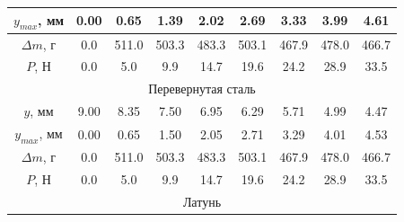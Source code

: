\documentclass[12pt]{article}
\begin{document}
\begin{enumerate}
\begin{table}
\begin{tabular}{|ccccccccc|}
            \multicolumn{1}{|c|}{$y_{max}$, мм} & \multicolumn{1}{c|}{0.00} & \multicolumn{1}{c|}{0.65}  & \multicolumn{1}{c|}{1.39}  & \multicolumn{1}{c|}{2.02}  & \multicolumn{1}{c|}{2.69}  & \multicolumn{1}{c|}{3.33}  & \multicolumn{1}{c|}{3.99}  & 4.61  \\ \hline
            \multicolumn{1}{|c|}{$\Delta m$, г} & \multicolumn{1}{c|}{0.0}  & \multicolumn{1}{c|}{511.0} & \multicolumn{1}{c|}{503.3} & \multicolumn{1}{c|}{483.3} & \multicolumn{1}{c|}{503.1} & \multicolumn{1}{c|}{467.9} & \multicolumn{1}{c|}{478.0} & 466.7 \\ \hline
            \multicolumn{1}{|c|}{$P$, Н}        & \multicolumn{1}{c|}{0.0}  & \multicolumn{1}{c|}{5.0}   & \multicolumn{1}{c|}{9.9}   & \multicolumn{1}{c|}{14.7}  & \multicolumn{1}{c|}{19.6}  & \multicolumn{1}{c|}{24.2}  & \multicolumn{1}{c|}{28.9}  & 33.5  \\ \hline
            \multicolumn{9}{|c|}{Перевернутая сталь}                                                                                                                                                                                                              \\ \hline
            \multicolumn{1}{|c|}{$y$, мм}       & \multicolumn{1}{c|}{9.00} & \multicolumn{1}{c|}{8.35}  & \multicolumn{1}{c|}{7.50}  & \multicolumn{1}{c|}{6.95}  & \multicolumn{1}{c|}{6.29}  & \multicolumn{1}{c|}{5.71}  & \multicolumn{1}{c|}{4.99}  & 4.47  \\ \hline
            \multicolumn{1}{|c|}{$y_{max}$, мм} & \multicolumn{1}{c|}{0.00} & \multicolumn{1}{c|}{0.65}  & \multicolumn{1}{c|}{1.50}  & \multicolumn{1}{c|}{2.05}  & \multicolumn{1}{c|}{2.71}  & \multicolumn{1}{c|}{3.29}  & \multicolumn{1}{c|}{4.01}  & 4.53  \\ \hline
            \multicolumn{1}{|c|}{$\Delta m$, г} & \multicolumn{1}{c|}{0.0}  & \multicolumn{1}{c|}{511.0} & \multicolumn{1}{c|}{503.3} & \multicolumn{1}{c|}{483.3} & \multicolumn{1}{c|}{503.1} & \multicolumn{1}{c|}{467.9} & \multicolumn{1}{c|}{478.0} & 466.7 \\ \hline
            \multicolumn{1}{|c|}{$P$, Н}        & \multicolumn{1}{c|}{0.0}  & \multicolumn{1}{c|}{5.0}   & \multicolumn{1}{c|}{9.9}   & \multicolumn{1}{c|}{14.7}  & \multicolumn{1}{c|}{19.6}  & \multicolumn{1}{c|}{24.2}  & \multicolumn{1}{c|}{28.9}  & 33.5  \\ \hline
            \multicolumn{9}{|c|}{Латунь}                                                                                                                                                                                                                          \\ \hline

\end{tabular}
\end{table}
\end{enumerate}
\end{document}
